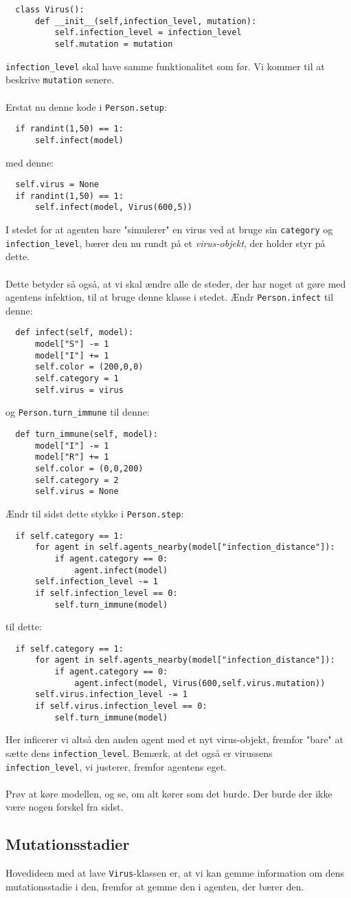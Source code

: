 \documentclass{article}
\begin{document}
\begin{lstlisting}
  class Virus():
      def __init__(self,infection_level, mutation):
          self.infection_level = infection_level
          self.mutation = mutation
\end{lstlisting}
\texttt{infection\_level} skal have samme funktionalitet som før. Vi kommer til at beskrive \texttt{mutation} senere.\\\\
Erstat nu denne kode i \texttt{Person.setup}:
\begin{lstlisting}
  if randint(1,50) == 1:
      self.infect(model)
\end{lstlisting}
med denne:
\begin{lstlisting}
  self.virus = None
  if randint(1,50) == 1:
      self.infect(model, Virus(600,5))
\end{lstlisting}
I stedet for at agenten bare "simulerer" en virus ved at bruge sin \texttt{category} og \texttt{infection\_level}, bærer den nu rundt på et \textit{virus-objekt}, der holder styr på dette.\\\\
Dette betyder så også, at vi skal ændre alle de steder, der har noget at gøre med agentens infektion, til at bruge denne klasse i stedet. Ændr \texttt{Person.infect} til denne:
\begin{lstlisting}
  def infect(self, model):
      model["S"] -= 1
      model["I"] += 1
      self.color = (200,0,0)
      self.category = 1
      self.virus = virus
\end{lstlisting}
og \texttt{Person.turn\_immune} til denne:
\begin{lstlisting}
  def turn_immune(self, model):
      model["I"] -= 1
      model["R"] += 1
      self.color = (0,0,200)
      self.category = 2
      self.virus = None
\end{lstlisting}
Ændr til sidst dette stykke i \texttt{Person.step}:
\begin{lstlisting}
  if self.category == 1:
      for agent in self.agents_nearby(model["infection_distance"]):
          if agent.category == 0:
              agent.infect(model)
      self.infection_level -= 1
      if self.infection_level == 0:
          self.turn_immune(model)
\end{lstlisting}
til dette:
\begin{lstlisting}
  if self.category == 1:
      for agent in self.agents_nearby(model["infection_distance"]):
          if agent.category == 0:
              agent.infect(model, Virus(600,self.virus.mutation))
      self.virus.infection_level -= 1
      if self.virus.infection_level == 0:
          self.turn_immune(model)
\end{lstlisting}
Her inficerer vi altså den anden agent med et nyt virus-objekt, fremfor "bare" at sætte dens \texttt{infection\_level}. Bemærk, at det også er virussens \texttt{infection\_level}, vi justerer, fremfor agentens eget.\\\\
Prøv at køre modellen, og se, om alt kører som det burde. Der burde der ikke være nogen forskel fra sidst.

\subsection{Mutationsstadier}
Hovedideen med at lave \texttt{Virus}-klassen er, at vi kan gemme information om dens mutationsstadie i den, fremfor at gemme den i agenten, der bærer den.
\end{document}
